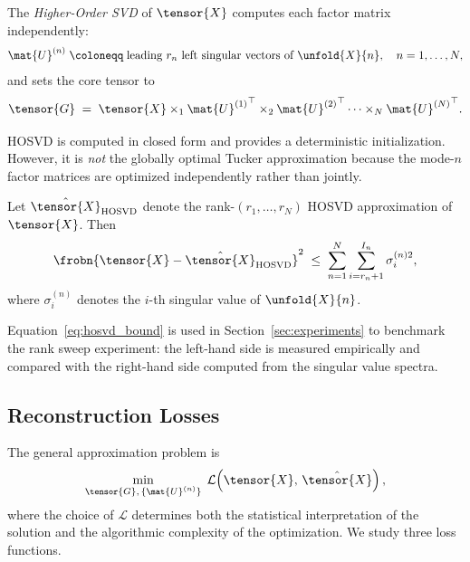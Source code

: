 \begin{definition}
  The \emph{Higher-Order SVD} of $\tensor{X}$ computes each factor matrix
  independently:
  \begin{equation}
    \mat{U}^{(n)}
    \;\coloneqq\;
    \text{leading } r_n \text{ left singular vectors of } \unfold{X}{n},
    \quad n = 1, \ldots, N,
    \label{eq:hosvd_factors}
  \end{equation}
  and sets the core tensor to
  \begin{equation}
    \tensor{G}
    \;=\; \tensor{X}
          \times_1 {\mat{U}^{(1)}}^\top
          \times_2 {\mat{U}^{(2)}}^\top
          \cdots
          \times_N {\mat{U}^{(N)}}^\top.
    \label{eq:hosvd_core}
  \end{equation}
\end{definition}

HOSVD is computed in closed form and provides a deterministic initialization.
However, it is \emph{not} the globally optimal Tucker approximation because
the mode-$n$ factor matrices are optimized independently rather than jointly.

\begin{proposition}
  Let $\hat{\tensor{X}}_{\mathrm{HOSVD}}$ denote the rank-$(r_1,\ldots,r_N)$
  HOSVD approximation of $\tensor{X}$.
  Then
  \begin{equation}
    \frobn{\tensor{X} - \hat{\tensor{X}}_{\mathrm{HOSVD}}}^2
    \;\leq\;
    \sum_{n=1}^{N} \sum_{i=r_n+1}^{I_n} \sigma_i^{(n)2},
    \label{eq:hosvd_bound}
  \end{equation}
  where $\sigma_i^{(n)}$ denotes the $i$-th singular value of $\unfold{X}{n}$.
\end{proposition}

Equation~\eqref{eq:hosvd_bound} is used in Section~\ref{sec:experiments}
to benchmark the rank sweep experiment:
the left-hand side is measured empirically and compared with the right-hand
side computed from the singular value spectra.

\subsection{Reconstruction Losses}
\label{subsec:losses}

The general approximation problem is
\begin{equation}
  \min_{\tensor{G},\, \{\mat{U}^{(n)}\}}\;
  \mathcal{L}\!\left(\tensor{X},\, \hat{\tensor{X}}\right),
  \label{eq:general_opt}
\end{equation}
where the choice of $\mathcal{L}$ determines both the statistical
interpretation of the solution and the algorithmic complexity of
the optimization.
We study three loss functions.

